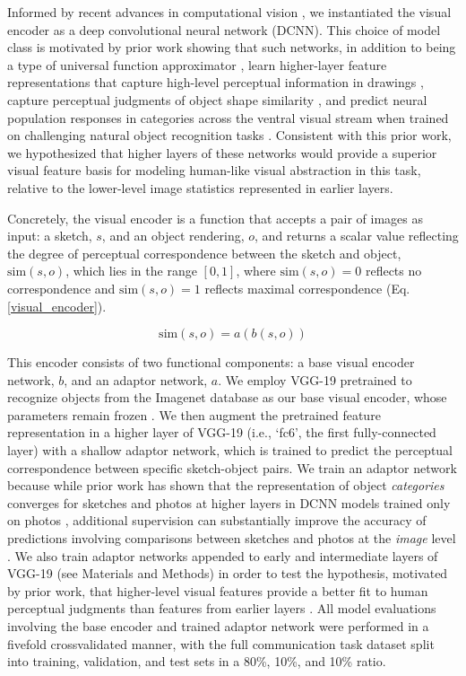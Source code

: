 \documentclass[9pt,twocolumn,twoside]{pnas-new}
\begin{document}
Informed by recent advances in computational vision \cite{FanCommon2018,yamins2014performance}, we instantiated the visual encoder as a deep convolutional neural network (DCNN). 
This choice of model class is motivated by prior work showing that such networks, in addition to being a type of universal function approximator \cite{hornik1991approximation}, learn higher-layer feature representations that capture high-level perceptual information in drawings \cite{FanCommon2018}, capture perceptual judgments of object shape similarity \cite{kubilius2016deep}, and predict neural population responses in categories across the ventral visual stream \cite{yamins2014performance} when trained on challenging natural object recognition tasks \cite{deng2009imagenet}. 
Consistent with this prior work, we hypothesized that higher layers of these networks would provide a superior visual feature basis for modeling human-like visual abstraction in this task, relative to the lower-level image statistics represented in earlier layers.

Concretely, the visual encoder is a function that accepts a pair of images as input: a sketch, $s$, and an object rendering, $o$, and returns a scalar value reflecting the degree of perceptual correspondence between the sketch and object, $\textrm{sim}(s,o)$, which lies in the range $[0,1]$, where $\textrm{sim}(s,o)=0$ reflects no correspondence and $\textrm{sim}(s,o)=1$ reflects maximal correspondence (Eq. \ref{visual_encoder}).

\begin{equation}
\label{visual_encoder}
\textrm{sim}(s,o) = a(b(s,o))
\end{equation}

This encoder consists of two functional components: a base visual encoder network, $b$, and an adaptor network, $a$. 
We employ VGG-19 pretrained to recognize objects from the Imagenet database as our base visual encoder, whose parameters remain frozen \cite{simonyan2014very}. 
We then augment the pretrained feature representation in a higher layer of VGG-19 (i.e., `fc6', the first fully-connected layer) with a shallow adaptor network, which is trained to predict the perceptual correspondence between specific sketch-object pairs. 
We train an adaptor network because while prior work has shown that the representation of object \textit{categories} converges for sketches and photos at higher layers in DCNN models trained only on photos \cite{FanCommon2018}, additional supervision can substantially improve the accuracy of predictions involving comparisons between sketches and photos at the \textit{image} level \cite{sangkloy2016sketchy}. 
We also train adaptor networks appended to early and intermediate layers of VGG-19 (see Materials and Methods) in order to test the hypothesis, motivated by prior work, that higher-level visual features provide a better fit to human perceptual judgments than features from earlier layers \cite{kubilius2016deep}.
All model evaluations involving the base encoder and trained adaptor network were performed in a fivefold crossvalidated manner, with the full communication task dataset split into training, validation, and test sets in a 80\%, 10\%, and 10\% ratio. 
\end{document}
